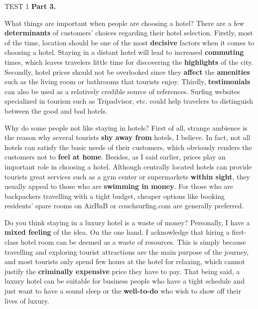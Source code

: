 \begin{glossarymc}[Cambridge 15]
\begin{test}{TEST 1}
    \noindent
    \textbf{Part 3.}
    \begin{qa}{What things are important when people are choosing a hotel?}
    There are a few \textbf{determinants} of customers’ choices regarding their hotel selection. Firstly, most of the time, location should be one of the most \textbf{decisive} factors when it comes to choosing a hotel. Staying in a distant hotel will lead to increased \textbf{commuting} times, which leaves travelers little time for discovering the \textbf{highlights} of the city. Secondly, hotel prices should not be overlooked since they \textbf{affect} the \textbf{amenities} such as the living room or bathrooms that tourists enjoy. Thirdly, \textbf{testimonials} can also be used as a relatively credible source of references. Surfing websites specialized in tourism such as Tripadvisor, etc. could help travelers to distinguish between the good and bad hotels.
    \end{qa}

    \begin{qa}{Why do some people not like staying in hotels?}
    First of all, strange ambience is the reason why several tourists \textbf{shy away from} hotels, I believe. In fact, not all hotels can satisfy the basic needs of their customers, which obviously renders the customers not to \textbf{feel at home}. Besides, as I said earlier, prices play an important role in choosing a hotel. Although centrally located hotels can provide tourists great services such as a gym center or supermarkets \textbf{within sight}, they usually appeal to those who are \textbf{swimming in money}. For those who are backpackers travelling with a tight budget, cheaper options like booking residents’ spare rooms on AirBnB or couchsurfing.com are generally preferred.
    \end{qa}

    \begin{qa}{Do you think staying in a luxury hotel is a waste of money?}
    Personally, I have a \textbf{mixed feeling} of the idea. On the one hand, I acknowledge that hiring a first-class hotel room can be deemed as a waste of resources. This is simply because travelling and exploring tourist attractions are the main purpose of the journey, and most tourists only spend few hours at the hotel for relaxing, which cannot justify the \textbf{criminally expensive} price they have to pay. That being said, a luxury hotel can be suitable for business people who have a tight schedule and just want to have a sound sleep or the \textbf{well-to-do} who wish to show off their lives of luxury.
    \end{qa}


\end{test}
\end{glossarymc}
